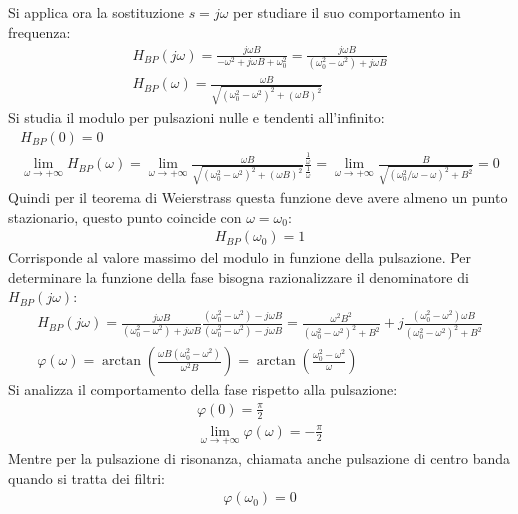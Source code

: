 \documentclass{article}
\numberwithin{equation}{subsection}
\begin{document}
Si applica ora la sostituzione $s=j\omega$ per studiare il suo comportamento in frequenza:
\begin{gather*}
    H_{BP}(j\omega)=\displaystyle\frac{j\omega B}{-\omega^2+j\omega B+\omega_0^2}=\frac{j\omega B}{(\omega_0^2-\omega^2)+j\omega B}\\
    H_{BP}(\omega)=\displaystyle\frac{\omega B}{\sqrt{(\omega_0^2-\omega^2)^2+(\omega B)^2}}
\end{gather*}
Si studia il modulo per pulsazioni nulle e tendenti all'infinito:
\begin{gather*}
    H_{BP}(0)=0\\
    \lim_{\omega\to+\infty}H_{BP}(\omega)=\lim_{\omega\to+\infty}\displaystyle\frac{\omega B}{\sqrt{(\omega_0^2-\omega^2)^2+(\omega B)^2}}\frac{\frac{1}\omega}{\frac{1}\omega}=\lim_{\omega\to+\infty}\displaystyle\frac{B}{\sqrt{(\omega_0^2/\omega-\omega)^2+B^2}}=0
\end{gather*}
Quindi per il teorema di Weierstrass questa funzione deve avere almeno un punto stazionario, questo punto coincide con $\omega=\omega_0$:
\begin{gather*}
    H_{BP}(\omega_0)=1
\end{gather*}
Corrisponde al valore massimo del modulo in funzione della pulsazione. 
Per determinare la funzione della fase bisogna razionalizzare il denominatore di $H_{BP}(j\omega)$:
\begin{gather*}
    H_{BP}(j\omega)=\displaystyle\frac{j\omega B}{(\omega_0^2-\omega^2)+j\omega B}\frac{(\omega_0^2-\omega^2)-j\omega B}{(\omega_0^2-\omega^2)-j\omega B}=\frac{\omega^2B^2}{(\omega_0^2-\omega^2)^2+B^2}+j\frac{(\omega_0^2-\omega^2)\omega B}{(\omega_0^2-\omega^2)^2+B^2}\\
    \varphi(\omega)=\arctan\left(\frac{\omega B(\omega_0^2-\omega^2)}{\omega^2 B}\right)=\arctan\left(\frac{\omega_0^2-\omega^2}{\omega}\right)
\end{gather*}
Si analizza il comportamento della fase rispetto alla pulsazione:
\begin{gather*}
    \varphi(0)=\displaystyle\frac{\pi}{2}\\
    \lim_{\omega\to+\infty}\varphi(\omega)=-\displaystyle\frac{\pi}{2}
\end{gather*}
Mentre per la pulsazione di risonanza, chiamata anche pulsazione di centro banda quando si tratta dei filtri:
\begin{gather*}
    \varphi(\omega_0)=0
\end{gather*}
\end{document}
